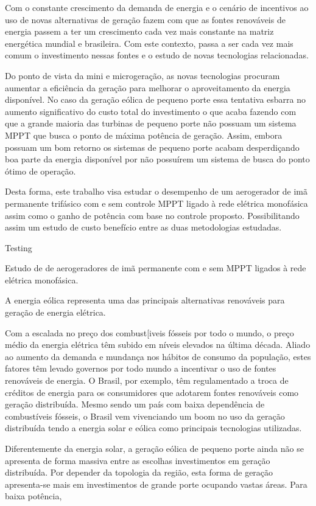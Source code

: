 Com o constante crescimento da demanda de energia e o cenário de incentivos ao uso de novas alternativas de geração fazem com que as fontes renováveis de energia passem a ter um crescimento cada vez mais constante na matriz energética mundial e brasileira. Com este contexto, passa a ser cada vez mais comum o investimento nessas fontes e o estudo de novas tecnologias relacionadas.

Do ponto de vista da mini e microgeração, as novas tecnologias procuram aumentar a eficiência da geração para melhorar o aproveitamento da energia disponível. No caso da geração eólica de pequeno porte essa tentativa esbarra no aumento significativo do custo total do investimento o que acaba fazendo com que a grande maioria das turbinas de pequeno porte não possuam um sistema MPPT que busca o ponto de máxima potência de geração. Assim, embora possuam um bom retorno os sistemas de pequeno porte acabam desperdiçando boa parte da energia disponível por não possuírem um sistema de busca do ponto ótimo de operação.

Desta forma, este trabalho visa estudar o desempenho de um aerogerador de imã permanente trifásico com e sem controle MPPT ligado à rede elétrica monofásica assim como o ganho de potência com base no controle proposto. Possibilitando assim um estudo de custo benefício entre as duas metodologias estudadas.


Testing



 



    Estudo de de aerogeradores de imã permanente com e sem MPPT ligados à rede elétrica monofásica.
    
    A energia eólica representa uma das principais alternativas renováveis para geração de
    energia elétrica.
    
    Com a escalada no preço dos combust[iveis fósseis por todo o mundo, o preço médio da energia elétrica têm subido em níveis elevados na última década. Aliado ao aumento da demanda e mundança nos hábitos de consumo da população, estes fatores têm levado governos por todo mundo a incentivar o uso de fontes renováveis de energia. O Brasil, por exemplo, têm regulamentado a troca de créditos de energia para os consumidores que adotarem fontes renováveis como geração distribuída. Mesmo sendo um país com baixa dependência de combustíveis fósseis, o Brasil vem vivenciando um boom no uso da geração distribuída tendo a energia solar e eólica como principais tecnologias utilizadas.
    
    
    
    
    Diferentemente da energia solar, a geração eólica de pequeno porte ainda não se apresenta de forma massiva entre as escolhas investimentos em geração distribuída. Por depender da topologia da região, esta forma de geração apresenta-se mais em investimentos de grande porte ocupando vastas áreas. Para baixa potência, 




